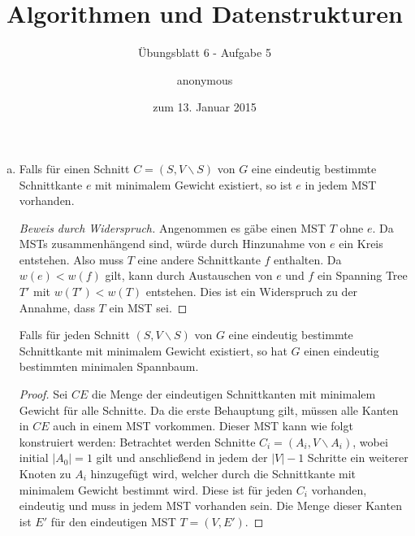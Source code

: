 \documentclass[a4paper]{scrartcl}
\title{Algorithmen und Datenstrukturen}
\subtitle{Übungsblatt 6 - Aufgabe 5}
\author{
    anonymous
}
\date{zum 13. Januar 2015}
\begin{document}
\maketitle

\begin{enumerate}[(a)]
    \item
        \begin{behaupt}
            Falls für einen Schnitt $C = (S, V \backslash S)$ von $G$ eine
            eindeutig bestimmte Schnittkante $e$ mit minimalem Gewicht
            existiert, so ist $e$ in jedem MST vorhanden.
        \end{behaupt}
        \begin{proof}[Beweis durch Widerspruch]
            Angenommen es gäbe einen MST $T$ ohne $e$.
            Da MSTs zusammenhängend sind, würde durch Hinzunahme von $e$ ein
            Kreis entstehen.
            Also muss $T$ eine andere Schnittkante $f$ enthalten.
            Da $w(e) < w(f)$ gilt, kann durch Austauschen von $e$ und $f$ ein
            Spanning Tree $T'$ mit $w(T') < w(T)$ entstehen.
            Dies ist ein Widerspruch zu der Annahme, dass $T$ ein MST sei.
        \end{proof}
        \begin{behaupt}
            Falls für jeden Schnitt $(S, V \backslash S)$ von $G$ eine eindeutig
            bestimmte Schnittkante mit minimalem Gewicht existiert, so hat $G$
            einen eindeutig bestimmten minimalen Spannbaum.
        \end{behaupt}
        \begin{proof}
            Sei $CE$ die Menge der eindeutigen Schnittkanten mit minimalem
            Gewicht für alle Schnitte.
            Da die erste Behauptung gilt, müssen alle Kanten in $CE$ auch in
            einem MST vorkommen.
            Dieser MST kann wie folgt konstruiert werden:
            Betrachtet werden Schnitte $C_i = (A_i, V \backslash A_i)$, wobei
            initial $|A_0| = 1$ gilt und anschließend in jedem der $|V| - 1$
            Schritte ein weiterer Knoten zu $A_i$ hinzugefügt wird, welcher
            durch die Schnittkante mit minimalem Gewicht bestimmt wird.
            Diese ist für jeden $C_i$ vorhanden, eindeutig und muss in jedem
            MST vorhanden sein.
            Die Menge dieser Kanten ist $E'$ für den eindeutigen MST
            $T = (V, E')$.
        \end{proof}


\end{enumerate}
\end{document}
